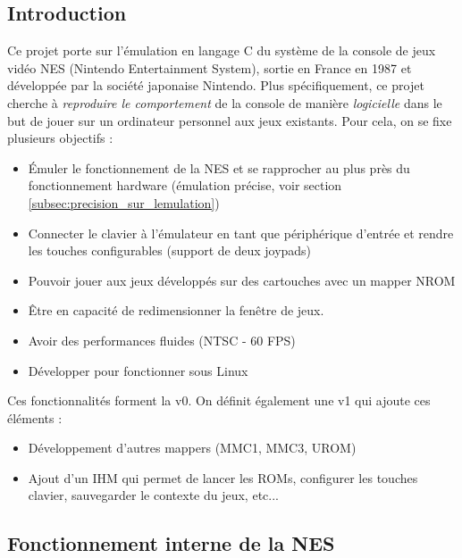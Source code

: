 \subsection{Introduction}

Ce projet porte sur l'émulation en langage C du système de la console de jeux vidéo NES (Nintendo Entertainment System), sortie en France en 1987 et développée par la société japonaise Nintendo. Plus spécifiquement, ce projet cherche à \emph{reproduire le comportement} de la console de manière \emph{logicielle} dans le but de jouer sur un ordinateur personnel aux jeux existants. Pour cela, on se fixe plusieurs objectifs :
\begin{itemize}
  \item Émuler le fonctionnement de la NES et se rapprocher au plus près du fonctionnement hardware (émulation précise, voir section \ref{subsec:precision_sur_lemulation})
  \item Connecter le clavier à l'émulateur en tant que périphérique d'entrée et rendre les touches configurables (support de deux joypads)
  \item Pouvoir jouer aux jeux développés sur des cartouches avec un mapper NROM
  \item Être en capacité de redimensionner la fenêtre de jeux.
  \item Avoir des performances fluides (NTSC - 60 FPS)
  \item Développer pour fonctionner sous Linux
\end{itemize}

\hspace{-6mm}Ces fonctionnalités forment la v0. On définit également une v1 qui ajoute ces éléments :

\begin{itemize}
  \item Développement d'autres mappers (MMC1, MMC3, UROM)
  \item Ajout d'un IHM qui permet de lancer les ROMs, configurer les touches clavier, sauvegarder le contexte du jeux, etc...
\end{itemize}

\subsection{Fonctionnement interne de la NES}
\label{subsec:fonctionnement_interne_nes}

